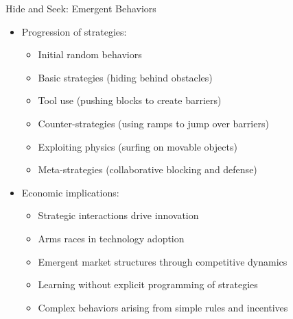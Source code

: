 \documentclass[10pt]{beamer}
\begin{document}
\begin{frame}{Hide and Seek: Emergent Behaviors}
    \begin{itemize}
        \item Progression of strategies:
        \begin{itemize}
            \item Initial random behaviors
            \item Basic strategies (hiding behind obstacles)
            \item Tool use (pushing blocks to create barriers)
            \item Counter-strategies (using ramps to jump over barriers)
            \item Exploiting physics (surfing on movable objects)
            \item Meta-strategies (collaborative blocking and defense)
        \end{itemize}
        \vspace{0.2cm}
        \item Economic implications:
        \begin{itemize}
            \item Strategic interactions drive innovation
            \item Arms races in technology adoption
            \item Emergent market structures through competitive dynamics
            \item Learning without explicit programming of strategies
            \item Complex behaviors arising from simple rules and incentives
        \end{itemize}
    \end{itemize}
\end{frame}

\end{document}
